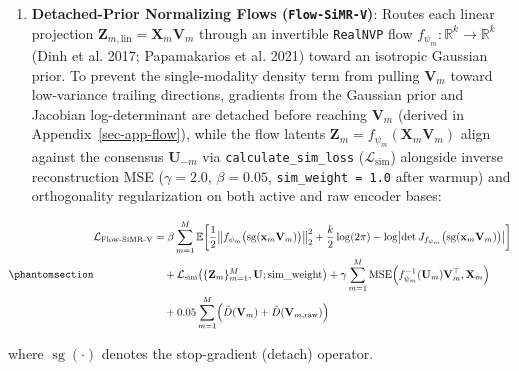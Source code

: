 \documentclass[
  10pt,
  letterpaper,
]{report}
\begin{document}
\begin{enumerate}
  \texttt{0.05} Stiefel orthogonality defect regularizer (\texttt{0.5}
  when \(p_m \le k\)) on \(\mathbf{V}_m\) and
  \(\mathbf{V}_{m,\text{raw}}\). Because non-linearity is restricted to
  the generative decoders \(g_{\phi_m}\), out-of-sample inference
  \(\mathbf{Z}_{m,\text{lin}} = \mathbf{X}_{m,\text{test}} \mathbf{V}_m\)
  remains linear and auditable.
\item
  \textbf{Detached-Prior Normalizing Flows (\texttt{Flow-SiMR-V})}:
  Routes each linear projection
  \(\mathbf{Z}_{m,\text{lin}} = \mathbf{X}_m \mathbf{V}_m\) through an
  invertible \texttt{RealNVP} flow
  \(f_{\psi_m} : \mathbb{R}^k \to \mathbb{R}^k\) (Dinh et al. 2017;
  Papamakarios et al. 2021) toward an isotropic Gaussian prior. To
  prevent the single-modality density term from pulling \(\mathbf{V}_m\)
  toward low-variance trailing directions, gradients from the Gaussian
  prior and Jacobian log-determinant are detached before reaching
  \(\mathbf{V}_m\) (derived in Appendix~\ref{sec-app-flow}), while the
  flow latents \(\mathbf{Z}_m = f_{\psi_m}(\mathbf{X}_m \mathbf{V}_m)\)
  align against the consensus \(\mathbf{U}_{-m}\) via
  \texttt{calculate\_sim\_loss} (\(\mathcal{L}_{\text{sim}}\)) alongside
  inverse reconstruction MSE (\(\gamma = 2.0\), \(\beta = 0.05\),
  \texttt{sim\_weight\ =\ 1.0} after warmup) and orthogonality
  regularization on both active and raw encoder bases:
\end{enumerate}

\begin{equation}\protect\phantomsection\label{eq-flow-simr-v}{
\begin{aligned}
\mathcal{L}_{\text{Flow-SiMR-V}} &= \beta \sum_{m=1}^M \mathbb{E}\!\left[\frac{1}{2}\bigl\|f_{\psi_m}\bigl(\operatorname{sg}(\mathbf{x}_m \mathbf{V}_m)\bigr)\bigr\|_2^2 + \frac{k}{2}\log(2\pi) - \log\bigl|\det J_{f_{\psi_m}}\bigl(\operatorname{sg}(\mathbf{x}_m \mathbf{V}_m)\bigr)\bigr|\right] \\
&\quad + \mathcal{L}_{\text{sim}}\!\left(\{\mathbf{Z}_m\}_{m=1}^M, \mathbf{U}; \text{sim\_weight}\right) + \gamma \sum_{m=1}^M \operatorname{MSE}\!\left(f_{\psi_m}^{-1}(\mathbf{U}_m)\mathbf{V}_m^\top, \mathbf{X}_m\right) \\
&\quad + 0.05 \sum_{m=1}^M \Bigl(\tilde{D}(\mathbf{V}_m) + \tilde{D}(\mathbf{V}_{m,\text{raw}})\Bigr)
\end{aligned}
}\end{equation}

where \(\operatorname{sg}(\cdot)\) denotes the stop-gradient (detach)
operator.
\end{document}
